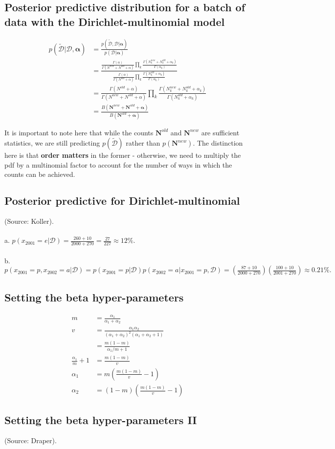 \documentclass{article}
\begin{document}
\subsection{Posterior predictive distribution for a batch of data with the Dirichlet-multinomial model}
\begin{align*}
p(\tilde{\mathcal{D}}|\mathcal{D},\bm\alpha) &= \frac{p(\tilde{\mathcal{D}},\mathcal{D}|\bm\alpha)}{p(\mathcal{D}|\bm\alpha)}\\
&= \frac{
	\frac{\Gamma(\alpha)}{\Gamma(N^{new}+N^{old}+\alpha)} \prod_{k} \frac{\Gamma(N_k^{new}+N_k^{old}+\alpha_k)}{\Gamma(\alpha_k)}
}{
	\frac{\Gamma(\alpha)}{\Gamma(N^{old}+\alpha)} \prod_{k} \frac{\Gamma(N_k^{old}+\alpha_k)}{\Gamma(\alpha_k)}
}\\
&= \frac{\Gamma(N^{old}+\alpha)}{\Gamma(N^{new}+N^{old}+\alpha)} \prod_{k} \frac{\Gamma(N_k^{new}+N_k^{old}+\alpha_k)}{\Gamma(N_k^{old}+\alpha_k)}\\
&= \frac{B(\mathbf{N}^{new}+\mathbf{N}^{old}+\bm\alpha)}{B(\mathbf{N}^{old}+\bm\alpha)}
\end{align*}

It is important to note here that while the counts $\mathbf{N}^{old}$ and $\mathbf{N}^{new}$ are sufficient statistics, we are still predicting $p(\tilde{\mathcal{D}})$ rather than $p(\mathbf{N}^{new})$. The distinction here is that \textbf{order matters} in the former - otherwise, we need to multiply the pdf by a multinomial factor to account for the number of ways in which the counts can be achieved.

\subsection{Posterior predictive for Dirichlet-multinomial}
(Source: Koller).\\\\
a. $p(x_{2001}=e|\mathcal{D}) = \frac{260+10}{2000+270} = \frac{27}{227} \approx 12\%.$\\\\
b. $p(x_{2001}=p,x_{2002}=a|\mathcal{D}) = p(x_{2001}=p|\mathcal{D})p(x_{2002}=a|x_{2001}=p,\mathcal{D}) = \left(\frac{87+10}{2000+270}\right) \left(\frac{100+10}{2001+270}\right) \approx 0.21\%.$

\subsection{Setting the beta hyper-parameters}
\begin{align*}
m &= \frac{\alpha_1}{\alpha_1+\alpha_2}\\
v &= \frac{\alpha_1\alpha_2}{(\alpha_1+\alpha_2)^2(\alpha_1+\alpha_2+1)}\\
&= \frac{m(1-m)}{\alpha_1/m+1}\\
\frac{\alpha_1}{m}+1 &= \frac{m(1-m)}{v}\\
\alpha_1 &= m\left(\frac{m(1-m)}{v}-1\right)\\
\alpha_2 &= (1-m)\left(\frac{m(1-m)}{v}-1\right)
\end{align*}

\subsection{Setting the beta hyper-parameters II}
(Source: Draper). 
\end{document}
